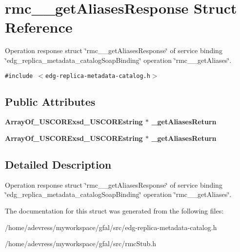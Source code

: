 \section{rmc\_\-\_\-get\-Aliases\-Response Struct Reference}
\label{structrmc____getAliasesResponse}
Operation response struct \char`\"{}rmc\_\-\_\-get\-Aliases\-Response\char`\"{} of service binding \char`\"{}edg\_\-replica\_\-metadata\_\-catalog\-Soap\-Binding\char`\"{} operation \char`\"{}rmc\_\-\_\-get\-Aliases\char`\"{}.  


{\tt \#include $<$edg-replica-metadata-catalog.h$>$}

\subsection*{Public Attributes}
\begin{CompactItemize}
\item 
\bf{Array\-Of\_\-USCORExsd\_\-USCOREstring} $\ast$ \textbf{\_\-get\-Aliases\-Return}\label{structrmc____getAliasesResponse_5e4e17db0239d44b0b3541c2a4c6c350}

\item 
\bf{Array\-Of\_\-USCORExsd\_\-USCOREstring} $\ast$ \textbf{\_\-get\-Aliases\-Return}\label{structrmc____getAliasesResponse_5e4e17db0239d44b0b3541c2a4c6c350}

\end{CompactItemize}


\subsection{Detailed Description}
Operation response struct \char`\"{}rmc\_\-\_\-get\-Aliases\-Response\char`\"{} of service binding \char`\"{}edg\_\-replica\_\-metadata\_\-catalog\-Soap\-Binding\char`\"{} operation \char`\"{}rmc\_\-\_\-get\-Aliases\char`\"{}. 



The documentation for this struct was generated from the following files:\begin{CompactItemize}
\item 
/home/adevress/myworkspace/gfal/src/edg-replica-metadata-catalog.h\item 
/home/adevress/myworkspace/gfal/src/rmc\-Stub.h\end{CompactItemize}
